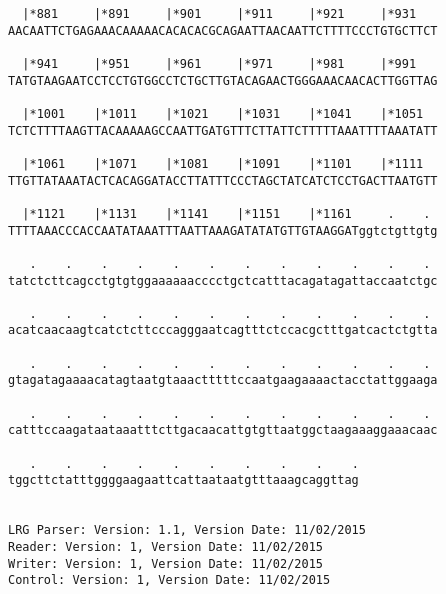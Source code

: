 \documentclass{article}
\begin{document}
\begin{Verbatim}
  |*881     |*891     |*901     |*911     |*921     |*931   
AACAATTCTGAGAAACAAAAACACACACGCAGAATTAACAATTCTTTTCCCTGTGCTTCT
                                                            
  |*941     |*951     |*961     |*971     |*981     |*991   
TATGTAAGAATCCTCCTGTGGCCTCTGCTTGTACAGAACTGGGAAACAACACTTGGTTAG
                                                            
  |*1001    |*1011    |*1021    |*1031    |*1041    |*1051  
TCTCTTTTAAGTTACAAAAAGCCAATTGATGTTTCTTATTCTTTTTAAATTTTAAATATT
                                                            
  |*1061    |*1071    |*1081    |*1091    |*1101    |*1111  
TTGTTATAAATACTCACAGGATACCTTATTTCCCTAGCTATCATCTCCTGACTTAATGTT
                                                            
  |*1121    |*1131    |*1141    |*1151    |*1161     .    . 
TTTTAAACCCACCAATATAAATTTAATTAAAGATATATGTTGTAAGGATggtctgttgtg
                                                            
   .    .    .    .    .    .    .    .    .    .    .    . 
tatctcttcagcctgtgtggaaaaaacccctgctcatttacagatagattaccaatctgc
                                                            
   .    .    .    .    .    .    .    .    .    .    .    . 
acatcaacaagtcatctcttcccagggaatcagtttctccacgctttgatcactctgtta
                                                            
   .    .    .    .    .    .    .    .    .    .    .    . 
gtagatagaaaacatagtaatgtaaactttttccaatgaagaaaactacctattggaaga
                                                            
   .    .    .    .    .    .    .    .    .    .    .    . 
catttccaagataataaatttcttgacaacattgtgttaatggctaagaaaggaaacaac
                                                            
   .    .    .    .    .    .    .    .    .    .
tggcttctatttggggaagaattcattaataatgtttaaagcaggttag
                                                 
                                                 
LRG Parser: Version: 1.1, Version Date: 11/02/2015
Reader: Version: 1, Version Date: 11/02/2015
Writer: Version: 1, Version Date: 11/02/2015
Control: Version: 1, Version Date: 11/02/2015
\end{Verbatim}
\end{document}
